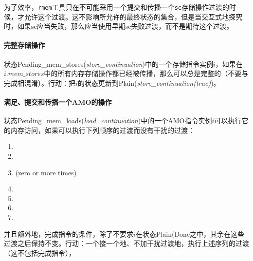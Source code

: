 \begin{commentary}
  为了效率，{\tt rmem}工具只在不可能采用一个提交和传播一个{\tt sc}存储操作过渡的时候，才允许这个过渡。这不影响所允许的最终状态的集合，但是当交互式地探究时，如果sc应当失败，那么应当使用早期sc失败过渡，而不是期待这个过渡。
\end{commentary}

\paragraph{完整存储操作}\label{omm:complete_stores}
状态{\sc Pending\_mem\_stores}({\it store\_continuation})中的一个存储指令实例$i$，如果在$i.\textit{mem\_stores}$中的所有内存存储操作都已经被传播，那么可以总是完整的（不要与完成相混淆）。行动：把$i$的状态更新到{\sc Plain}({\it store\_continuation(true)})。


\paragraph{满足、提交和传播一个AMO的操作}\label{omm:do_amo}
状态{\sc Pending\_mem\_loads}({\it load\_continuation})中的一个AMO指令实例$i$可以执行它的内存访问，如果可以执行下列顺序的过渡而没有干扰的过渡：
\begin{enumerate}
\item {}
\item {}
\item {} (zero or more times)
\item {}
\item {}
\item {}
\item {}
\end{enumerate}
并且额外地，完成指令的条件，除了不要求$i$在状态{\sc Plain}({\sc Done}之中，其余在这些过渡之后保持不变。行动：一个接一个地、不加干扰过渡地，执行上述序列的过渡（这不包括完成指令），

